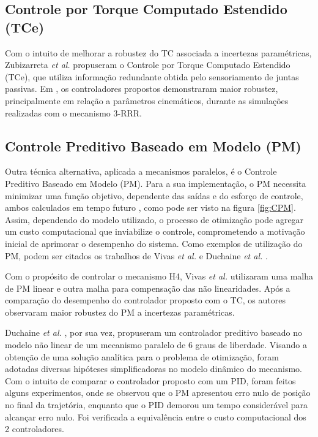 \documentclass[]{politex}
\begin{document}
\subsection{Controle por Torque Computado Estendido (TCe)}

Com o intuito de melhorar a robustez do TC associada a incertezas paramétricas, Zubizarreta \emph{et al.} \cite{Zubizarreta, Zubizarreta2, Zubizarreta3, Zubizarreta4} propuseram  o  Controle por Torque Computado Estendido (TCe), que utiliza informação redundante obtida pelo sensoriamento de juntas passivas. Em \cite{Zubizarreta}, os controladores propostos demonstraram maior robustez, principalmente em relação a parâmetros cinemáticos, durante as simulações realizadas com o mecanismo 3-RRR.

\subsection{Controle Preditivo Baseado em Modelo (PM)}

Outra técnica alternativa, aplicada a mecanismos paralelos, é o Controle Preditivo Baseado em Modelo (PM). Para a sua implementação, o PM necessita minimizar uma função objetivo, dependente das saídas e do esforço de controle, ambos calculados em tempo futuro \cite{Camacho}, como pode ser visto na figura \ref{fig:CPM}. Assim, dependendo do modelo utilizado, o processo de otimização pode agregar um custo computacional que inviabilize o controle, comprometendo a motivação inicial de aprimorar o desempenho do sistema. Como exemplos de utilização do PM, podem ser citados os trabalhos de Vivas \emph{et al.} \cite{Vivas} e   Duchaine \emph{et al.} \cite{Duchaine}.

Com o propósito de controlar o mecanismo H4, Vivas \emph{et al.} \cite{Vivas} utilizaram  uma malha de PM linear e outra malha para compensação das não linearidades. Após a comparação do desempenho do controlador proposto com  o TC, os autores observaram maior robustez do PM a incertezas paramétricas. 

Duchaine \emph{et al.} \cite{Duchaine}, por sua vez, propuseram um controlador preditivo baseado no modelo não linear de um mecanismo paralelo de 6 graus de liberdade. Visando a obtenção de uma solução analítica para o problema de otimização, foram adotadas diversas hipóteses simplificadoras no modelo dinâmico do mecanismo. Com o intuito de comparar o controlador proposto com um PID, foram feitos alguns experimentos, onde se observou  que o PM apresentou erro nulo de posição no final da trajetória, enquanto que o PID demorou um tempo considerável para alcançar erro nulo. Foi verificada a equivalência entre o custo computacional dos 2 controladores. 
\end{document}
